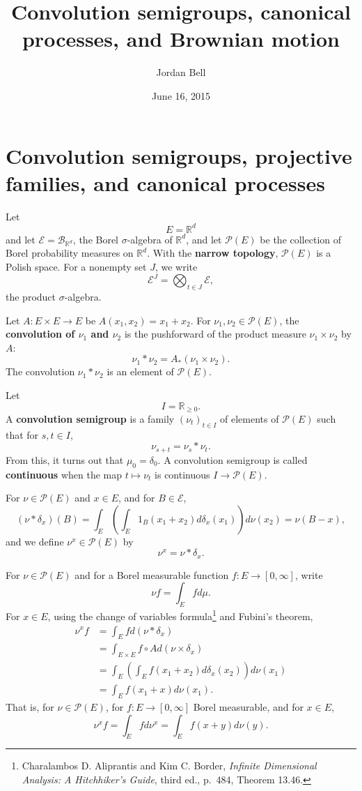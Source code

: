\documentclass{article}
\theoremstyle{definition}
\theoremstyle{definition}
\begin{document}
\title{Convolution semigroups, canonical processes, and Brownian motion}
\author{Jordan Bell}
\date{June 16, 2015}

\maketitle


\section{Convolution semigroups, projective families, and canonical processes}
Let
\[
E=\mathbb{R}^d
\]
and let $\mathscr{E}=\mathscr{B}_{\mathbb{R}^d}$, the Borel $\sigma$-algebra of $\mathbb{R}^d$, and
let $\mathscr{P}(E)$ be the collection of Borel probability measures on $\mathbb{R}^d$. With the \textbf{narrow
topology}, $\mathscr{P}(E)$ is a Polish space.
For a nonempty set $J$, we write
\[
\mathscr{E}^J = \bigotimes_{t \in J} \mathscr{E},
\]
the product $\sigma$-algebra.

Let $A:E \times E \to E$ be $A(x_1,x_2) = x_1+x_2$. For $\nu_1,\nu_2 \in \mathscr{P}(E)$,
the \textbf{convolution of $\nu_1$ and $\nu_2$} is the pushforward of the product measure $\nu_1 \times \nu_2$ 
by $A$:
\[
\nu_1 * \nu_2 = A_*(\nu_1 \times \nu_2).
\]
The convolution $\nu_1 * \nu_2$ is an element of $\mathscr{P}(E)$. 


Let
\[
I=\mathbb{R}_{\geq 0}.
\]
A \textbf{convolution semigroup} is a family $(\nu_t)_{t \in I}$ of elements of $\mathscr{P}(E)$ such that
for $s,t \in I$,
\[
\nu_{s+t} = \nu_s * \nu_t.
\]
From this, it turns out that $\mu_0=\delta_0$.
A convolution semigroup is called \textbf{continuous} when the map $t \mapsto \nu_t$ is continuous $I \to \mathscr{P}(E)$. 

For $\nu \in \mathscr{P}(E)$ and $x \in E$, and for $B \in \mathscr{E}$,
\[
(\nu * \delta_x)(B)
 =
\int_{E} \left( \int_{E} 1_B(x_1+x_2) d\delta_x(x_1) \right) d\nu(x_2) 
=\nu(B-x),
\]
and we define  $\nu^x \in \mathscr{P}(E)$ by
\[
\nu^x = \nu * \delta_x.
\] 

For $\nu \in \mathscr{P}(E)$ and for 
a Borel measurable function $f:E \to [0,\infty]$, write
\[
\nu f = \int_E f d\mu.
\]
For $x \in E$, using the change of variables formula\footnote{Charalambos D. Aliprantis
and Kim C. Border, {\em Infinite Dimensional Analysis: A Hitchhiker's Guide}, third ed., p.~484, Theorem 13.46.}
and Fubini's theorem,
\begin{align*}
\nu^x f &= \int_E f d(\nu*\delta_x)\\
&=\int_{E \times E} f \circ A d(\nu \times \delta_x)\\
&=\int_E \left(\int_E f(x_1+x_2) d\delta_x(x_2) \right) d\nu(x_1)\\
&=\int_E f(x_1+x) d\nu(x_1).
\end{align*}
That is, for $\nu \in \mathscr{P}(E)$, for $f:E \to [0,\infty]$ Borel measurable, and for $x \in E$,
\begin{equation}
\nu^x f = \int_E f d\nu^x = \int_E f(x+y) d\nu(y).
\label{shift}
\end{equation}
\end{document}
